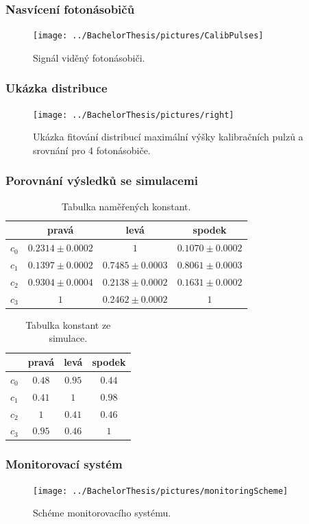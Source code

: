 \documentclass{beamer}
\begin{document}
\begin{frame}
\frametitle{Nasvícení fotonásobičů}
 \begin{figure}[H]
 \centering
 \texttt{[image: ../BachelorThesis/pictures/CalibPulses]}
 \caption{Signál viděný fotonásobiči.}
 \label{UVsource}
\end{figure}


\end{frame}  
 
\begin{frame}
\frametitle{Ukázka distribuce}
 \begin{figure}[H]
 \centering
 \texttt{[image: ../BachelorThesis/pictures/right]}
 \caption{Ukázka fitování distribucí maximální výšky kalibračních pulzů a srovnání pro 4 fotonásobiče.}
 \label{UVsource}
\end{figure}


\end{frame} 


\begin{frame}
\frametitle{Porovnání výsledků se simulacemi}

\begin{table}[H]
\centering
\begin{tabular}{|c|c|c|c|}
\hline
   & pravá & levá & spodek \\ \hline
$c_0$ & $0.2314 \pm 0.0002$    & $1$   				   & $0.1070 \pm 0.0002$     \\ \hline
$c_1$ & $0.1397 \pm 0.0002$    & $0.7485 \pm 0.0003$   & $0.8061 \pm 0.0003$      \\ \hline
$c_2$ & $0.9304 \pm 0.0004$    & $0.2138 \pm 0.0002$   & $0.1631 \pm 0.0002$      \\ \hline
$c_3$ & $1$    				   & $0.2462 \pm 0.0002$   & $1$      \\ \hline
\end{tabular}
\caption{Tabulka naměřených konstant.}
 \label{CalibConstTbl}
\end{table}






\begin{table}[H]

\begin{tabular}{|c|c|c|c|}
\hline
   & pravá & levá & spodek \\ \hline
$c_0$ & $0.48$    & $0.95$   & $0.44$     \\ \hline
$c_1$ & $0.41$    & $1$   	 & $0.98$      \\ \hline
$c_2$ & $1$    	  & $0.41$   & $0.46$      \\ \hline
$c_3$ & $0.95$    & $0.46$   & $1$      \\ \hline
\end{tabular}
\caption{Tabulka konstant ze simulace.}
 \label{CalibConstTblSim}
\end{table}


\end{frame} 
 
 
\begin{frame}
\frametitle{Monitorovací systém}
 \begin{figure}[H]
 \centering
 \texttt{[image: ../BachelorThesis/pictures/monitoringScheme]}
 \caption{Schéme monitorovacího systému.}
 \label{UVsource}
\end{figure}


\end{frame} 
\end{document}
